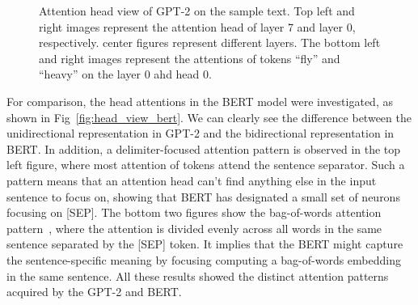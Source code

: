 \documentclass[]{article}
\begin{document}
\begin{figure}[!h]
\begin{subfigure}[b]{0.48\textwidth}
    \end{subfigure}
    \caption{Attention head view of GPT-2 on the sample text. Top left and right images represent the attention head of layer 7 and layer 0, respectively. 
    center figures represent different layers. 
    The bottom left and right images represent the attentions of tokens ``fly'' and ``heavy'' on the layer 0 ahd head 0.}
    \label{fig:head_view_gpt}
\end{figure}


For comparison, the head attentions in the BERT model were investigated, as shown in Fig~\ref{fig:head_view_bert}.
We can clearly see the difference between the unidirectional representation in GPT-2 and the bidirectional representation in BERT.
In addition, a delimiter-focused attention\cite{vig2019bertviz} pattern is observed in the top left figure, where most attention of tokens attend the sentence separator. Such a pattern means that an attention head can't find anything else in the input sentence to focus on, showing that BERT has designated a small set of neurons focusing on [SEP].
The bottom two figures show the bag-of-words attention pattern~\cite{vig2019bertviz}, where the attention is divided evenly across all words in the same sentence separated by the [SEP] token. 
It implies that the BERT might capture the sentence-specific meaning by focusing computing a bag-of-words embedding in the same sentence.
All these results showed the distinct attention patterns acquired by the GPT-2 and BERT.
\end{document}
